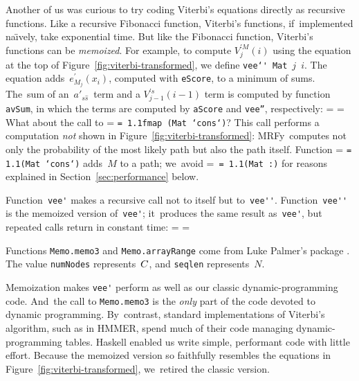 \documentclass[]{jfp1}
\makeatletter
\newcommand\mrfy{MRFy} %
\newcommand\alignwidth{\ensuremath C} %
\newcommand\naive{na\"\i ve}
\newcommand\figref[1]{Figure~\ref{fig:#1}}
\newcommand\secref[1]{Section~\ref{sec:#1}}
\newif\ifverbatimsmall
\newcommand{\mono}[1]{%
  {\@tempdima = \fontdimen2\font
   \texttt{\spaceskip = 1.1\@tempdima #1}}}
\newcommand\smallverbatiminput[1]{%
  \verbatimsmalltrue
  \presvtopsep=\topsep
  \topsep=0.78\topsep
  \verbatimsmallfalse
  \topsep=\presvtopsep
}
\newcommand\smallfuzzverbatiminput[2]{%
  \hfuzz=#1 \smallverbatiminput{#2}\hfuzz=0pt }
\makeatother
\begin{document}
Another of us was curious to try coding Viterbi's equations
directly as recursive functions.
Like a recursive Fibonacci function, Viterbi's functions,
if~implemented \naive ly,
take exponential time.
But like the Fibonacci function, Viterbi's functions can be
\emph{memoized}.
For example, to compute $V_j^{\prime M}(i)$ using the equation at the top
of \figref{viterbi-transformed}, we define
\mbox{\texttt{vee\char`\'} \texttt{Mat} $j$ $i$}.
The equation adds~$e^{\prime}_{M_{j}}(x_{i})$, computed
with \texttt{eScore}, to a minimum of sums.
The~sum of an~$a'_{s\hat s}$~term and a $V^{\prime s}_{j-1}(i-1)$ term 
is computed by function \texttt{avSum}, in which
the terms are computed by \texttt{aScore} and \texttt{vee''},
respectively:\label{code:vee-prime} 
\smallfuzzverbatiminput{2.9pt}{vfix}
What about the call to
\mono{\mbox{fmap (Mat `cons`)}}?
This call performs a computation \emph{not} shown
in \figref{viterbi-transformed}:
\mrfy\ computes not only the {probability} of the most likely path but 
also the path itself.
Function \mono{(Mat `cons`)} adds~$M$ to a path;
we~avoid \mbox{\mono{(Mat :)}} for reasons explained
in \secref{performance} below. 

Function~\verb+vee'+ makes a recursive call not to itself but
to~\verb+vee''+. 
Function~\verb+vee''+ is the {memoized} version of~\verb+vee'+;
it~produces the same result as~\verb+vee'+,
but repeated calls return in constant time:
\smallverbatiminput{memo}
Functions \texttt{Memo.memo3} and \texttt{Memo.arrayRange} come from
Luke Palmer's
package
.
The value
\texttt{numNodes} represents~$\alignwidth$,
and \texttt{seqlen} represents~$N$.

Memoization makes \verb+vee'+ perform as well as our classic
dynamic-programming code.
And~the call to \texttt{Memo.memo3} is the \emph{only} part of the code
devoted to dynamic programming.
By~contrast, standard implementations of Viterbi's algorithm, such as in HMMER,
spend much of their code 
managing dynamic-programming tables.
Haskell enabled us write simple, performant code with little effort.
%
Because the memoized version so faithfully resembles the equations in
\figref{viterbi-transformed}, we~retired the classic version.



\end{document}
